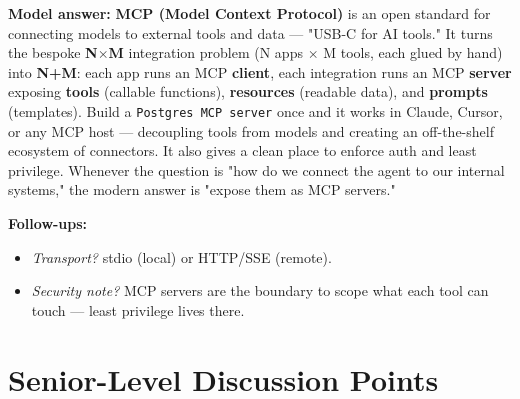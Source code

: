 \documentclass[11pt]{article}
\providecommand{\tightlist}{\setlength{\itemsep}{1pt}\setlength{\parskip}{0pt}}
\begin{document}
\textbf{Model answer:} \textbf{MCP (Model Context Protocol)} is an open standard for connecting models to external tools and data --- "USB-C for AI tools." It turns the bespoke \textbf{N\(\times\)M} integration problem (N apps \(\times\) M tools, each glued by hand) into \textbf{N+M}: each app runs an MCP \textbf{client}, each integration runs an MCP \textbf{server} exposing \textbf{tools} (callable functions), \textbf{resources} (readable data), and \textbf{prompts} (templates). Build a \texttt{Postgres\ MCP\ server} once and it works in Claude, Cursor, or any MCP host --- decoupling tools from models and creating an off-the-shelf ecosystem of connectors. It also gives a clean place to enforce auth and least privilege. Whenever the question is "how do we connect the agent to our internal systems," the modern answer is "expose them as MCP servers."

\textbf{Follow-ups:}

\begin{itemize}
\tightlist
\item
  \emph{Transport?} stdio (local) or HTTP/SSE (remote).
\item
  \emph{Security note?} MCP servers are the boundary to scope what each tool can touch --- least privilege lives there.
\end{itemize}

\section{Senior-Level Discussion Points}\label{senior-level-discussion-points}
\end{document}
